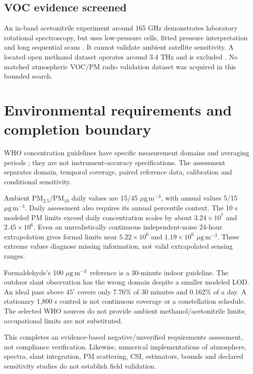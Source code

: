 \documentclass[conference]{IEEEtran}
\newcommand{\ugm}{\ensuremath{\mu\mathrm{g\,m}^{-3}}}
\begin{document}
\subsection{VOC evidence screened}
An in-band acetonitrile experiment around 165 GHz demonstrates laboratory rotational spectroscopy, but uses low-pressure cells, fitted pressure interpretation and long sequential scans \cite{gudz}. It cannot validate ambient satellite sensitivity. A located open methanol dataset operates around 3.4 THz and is excluded \cite{leeds}. No matched atmospheric VOC/PM radio validation dataset was acquired in this bounded search.

\section{Environmental requirements and completion boundary}
WHO concentration guidelines have specific measurement domains and averaging periods \cite{who2021,who2010}; they are not instrument-accuracy specifications. The assessment separates domain, temporal coverage, paired reference data, calibration and conditional sensitivity.

Ambient PM$_{2.5}$/PM$_{10}$ daily values are 15/45 \ugm, with annual values 5/15 \ugm. Daily assessment also requires its annual percentile context. The 10 s modeled PM limits exceed daily concentration scales by about $3.24\times10^7$ and $2.45\times10^6$. Even an unrealistically continuous independent-noise 24-hour extrapolation gives formal limits near $5.22\times10^6$ and $1.19\times10^6$ \ugm. These extreme values diagnose missing information, not valid extrapolated sensing ranges.

Formaldehyde's 100 \ugm\ reference is a 30-minute indoor guideline. The outdoor slant observation has the wrong domain despite a smaller modeled LOD. An ideal pass above $45^\circ$ covers only 7.76\% of 30 minutes and 0.162\% of a day. A stationary 1,800 s control is not continuous coverage or a constellation schedule. The selected WHO sources do not provide ambient methanol/acetonitrile limits; occupational limits are not substituted.

This completes an evidence-based negative/unverified requirements assessment, not compliance verification. Likewise, numerical implementations of atmosphere, spectra, slant integration, PM scattering, CSI, estimators, bounds and declared sensitivity studies do not establish field validation.
\end{document}
